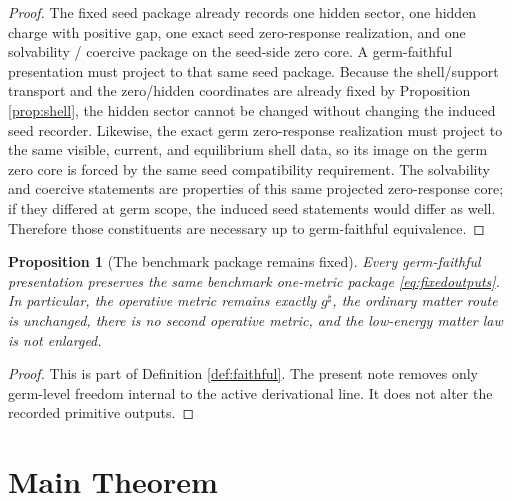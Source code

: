 \documentclass[11pt]{article}
\newcommand{\CompletedMetric}{g^{\sharp}}
\newtheorem{proposition}{Proposition}
\begin{document}
\begin{proof}
The fixed seed package already records one hidden sector, one hidden charge with positive gap, one exact seed zero-response realization, and one solvability / coercive package on the seed-side zero core. A germ-faithful presentation must project to that same seed package. Because the shell/support transport and the zero/hidden coordinates are already fixed by Proposition \ref{prop:shell}, the hidden sector cannot be changed without changing the induced seed recorder. Likewise, the exact germ zero-response realization must project to the same visible, current, and equilibrium shell data, so its image on the germ zero core is forced by the same seed compatibility requirement. The solvability and coercive statements are properties of this same projected zero-response core; if they differed at germ scope, the induced seed statements would differ as well. Therefore those constituents are necessary up to germ-faithful equivalence.
\end{proof}

\begin{proposition}[The benchmark package remains fixed]
\label{prop:benchmark}
Every germ-faithful presentation preserves the same benchmark one-metric package \eqref{eq:fixedoutputs}. In particular, the operative metric remains exactly \(\CompletedMetric\), the ordinary matter route is unchanged, there is no second operative metric, and the low-energy matter law is not enlarged.
\end{proposition}

\begin{proof}
This is part of Definition \ref{def:faithful}. The present note removes only germ-level freedom internal to the active derivational line. It does not alter the recorded primitive outputs.
\end{proof}

\section{Main Theorem}
\end{document}

